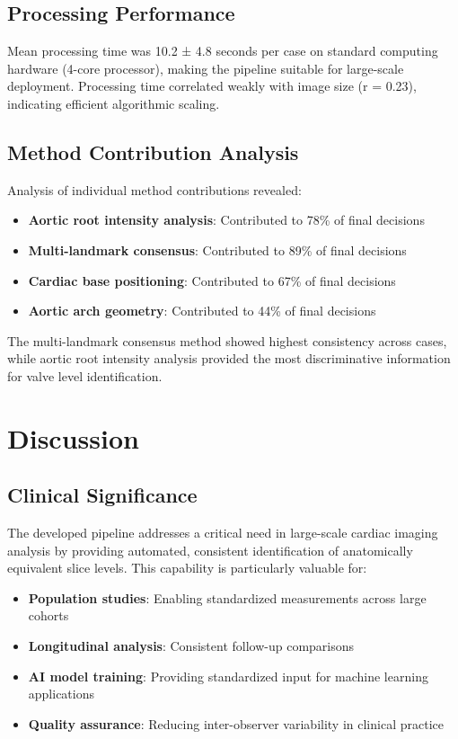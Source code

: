 \documentclass[11pt,a4paper]{article}
\begin{document}
\subsection{Processing Performance}

Mean processing time was 10.2 ± 4.8 seconds per case on standard computing hardware (4-core processor), making the pipeline suitable for large-scale deployment. Processing time correlated weakly with image size (r = 0.23), indicating efficient algorithmic scaling.

\subsection{Method Contribution Analysis}

Analysis of individual method contributions revealed:
\begin{itemize}
\item \textbf{Aortic root intensity analysis}: Contributed to 78\% of final decisions
\item \textbf{Multi-landmark consensus}: Contributed to 89\% of final decisions
\item \textbf{Cardiac base positioning}: Contributed to 67\% of final decisions
\item \textbf{Aortic arch geometry}: Contributed to 44\% of final decisions
\end{itemize}

The multi-landmark consensus method showed highest consistency across cases, while aortic root intensity analysis provided the most discriminative information for valve level identification.

\section{Discussion}

\subsection{Clinical Significance}

The developed pipeline addresses a critical need in large-scale cardiac imaging analysis by providing automated, consistent identification of anatomically equivalent slice levels. This capability is particularly valuable for:

\begin{itemize}
\item \textbf{Population studies}: Enabling standardized measurements across large cohorts
\item \textbf{Longitudinal analysis}: Consistent follow-up comparisons
\item \textbf{AI model training}: Providing standardized input for machine learning applications
\item \textbf{Quality assurance}: Reducing inter-observer variability in clinical practice
\end{itemize}
\end{document}
